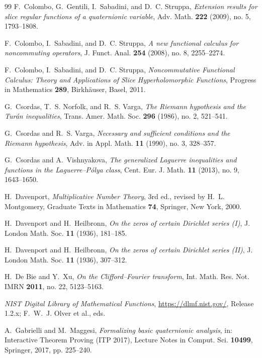 \documentclass[11pt]{amsart}
\theoremstyle{plain}
\theoremstyle{definition}
\theoremstyle{remark}
\begin{document}
\begin{thebibliography}{99}
F.~Colombo, G.~Gentili, I.~Sabadini, and D.~C. Struppa,
\emph{Extension results for slice regular functions of a quaternionic variable},
Adv. Math. \textbf{222} (2009), no. 5, 1793--1808.

F.~Colombo, I.~Sabadini, and D.~C. Struppa,
\emph{A new functional calculus for noncommuting operators},
J. Funct. Anal. \textbf{254} (2008), no. 8, 2255--2274.

F.~Colombo, I.~Sabadini, and D.~C. Struppa,
\emph{Noncommutative Functional Calculus: Theory and Applications of Slice Hyperholomorphic
Functions},
Progress in Mathematics \textbf{289}, Birkh\"auser, Basel, 2011.

G.~Csordas, T.~S. Norfolk, and R.~S. Varga,
\emph{The Riemann hypothesis and the Tur\'an inequalities},
Trans. Amer. Math. Soc. \textbf{296} (1986), no. 2, 521--541.

G.~Csordas and R.~S. Varga,
\emph{Necessary and sufficient conditions and the Riemann hypothesis},
Adv. in Appl. Math. \textbf{11} (1990), no. 3, 328--357.

G.~Csordas and A.~Vishnyakova,
\emph{The generalized Laguerre inequalities and functions in the Laguerre--P\'olya class},
Cent. Eur. J. Math. \textbf{11} (2013), no. 9, 1643--1650.

H.~Davenport,
\emph{Multiplicative Number Theory}, 3rd ed., revised by H.~L. Montgomery,
Graduate Texts in Mathematics \textbf{74}, Springer, New York, 2000.

H.~Davenport and H.~Heilbronn,
\emph{On the zeros of certain Dirichlet series (I)},
J. London Math. Soc. \textbf{11} (1936), 181--185.

H.~Davenport and H.~Heilbronn,
\emph{On the zeros of certain Dirichlet series (II)},
J. London Math. Soc. \textbf{11} (1936), 307--312.

H.~De Bie and Y.~Xu,
\emph{On the Clifford--Fourier transform},
Int. Math. Res. Not. IMRN \textbf{2011}, no. 22, 5123--5163.

\emph{NIST Digital Library of Mathematical Functions}, \url{https://dlmf.nist.gov/},
Release 1.2.x; F.~W.~J. Olver et al., eds.

A.~Gabrielli and M.~Maggesi,
\emph{Formalizing basic quaternionic analysis},
in: Interactive Theorem Proving (ITP 2017), Lecture Notes in Comput. Sci. \textbf{10499},
Springer, 2017, pp. 225--240.


\end{thebibliography}
\end{document}
